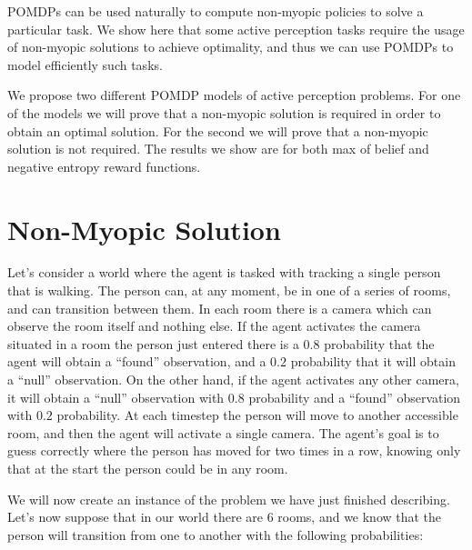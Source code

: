 POMDPs can be used naturally to compute non-myopic policies to solve a particular task. We show here
that some active perception tasks require the usage of non-myopic solutions to achieve optimality,
and thus we can use POMDPs to model efficiently such tasks.

We propose two different POMDP models of active perception problems. For one of the models we will
prove that a non-myopic solution is required in order to obtain an optimal solution. For the second
we will prove that a non-myopic solution is not required. The results we show are for both max of
belief and negative entropy reward functions.

\section{Non-Myopic Solution}

Let's consider a world where the agent is tasked with tracking a single person that is walking. The
person can, at any moment, be in one of a series of rooms, and can transition between them. In each
room there is a camera which can observe the room itself and nothing else. If the agent activates
the camera situated in a room the person just entered there is a $0.8$ probability that the agent will
obtain a ``found'' observation, and a $0.2$ probability that it will obtain a ``null'' observation.
On the other hand, if the agent activates any other camera, it will obtain a ``null'' observation
with $0.8$ probability and a ``found'' observation with $0.2$ probability. At each timestep
the person will move to another accessible room, and then the agent will activate a single camera.
The agent's goal is to guess correctly where the person has moved for two times in a row, knowing
only that at the start the person could be in any room.

We will now create an instance of the problem we have just finished describing. Let's now suppose
that in our world there are 6 rooms, and we know that the person will transition from one to another
with the following probabilities:

